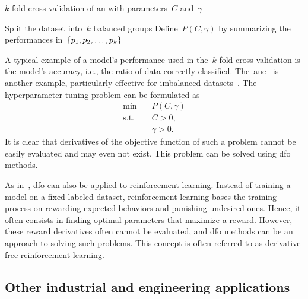 \begin{algorithm}
    \caption{$k$-fold cross-validation of an  with parameters~$C$ and~$\gamma$}
    \label{alg:cross-validation}
    \DontPrintSemicolon
    \onehalfspacing
    Split the dataset into~$k$ balanced groups\;
    Define~$P(C, \gamma)$ by summarizing the performances in~$\{p_1, p_2, \dots, p_k\}$\;
\end{algorithm}

A typical example of a model's performance used in the~$k$-fold cross-validation is the model's accuracy, i.e., the ratio of data correctly classified.
The~\gls{auc}~\cite{Hanley_Mcneil_1982} is another example, particularly effective for imbalanced datasets~\cite{Bradley_1997}.
The hyperparameter tuning problem can be formulated as
\begin{equation*}
    \begin{aligned}
        \min        & \quad P(C, \gamma)\\
        \text{s.t.} & \quad C > 0,\\
                    & \quad \gamma > 0.
    \end{aligned}
\end{equation*}
It is clear that derivatives of the objective function of such a problem cannot be easily evaluated and may even not exist.
This problem can be solved using \gls{dfo} methods.

As in~\cite{Qian_Yu_2021}, \gls{dfo} can also be applied to reinforcement learning.
Instead of training a model on a fixed labeled dataset, reinforcement learning bases the training process on rewarding expected behaviors and punishing undesired ones.
Hence, it often consists in finding optimal parameters that maximize a reward.
However, these reward derivatives often cannot be evaluated, and \gls{dfo} methods can be an approach to solving such problems.
This concept is often referred to as derivative-free reinforcement learning.

\subsection{Other industrial and engineering applications}

